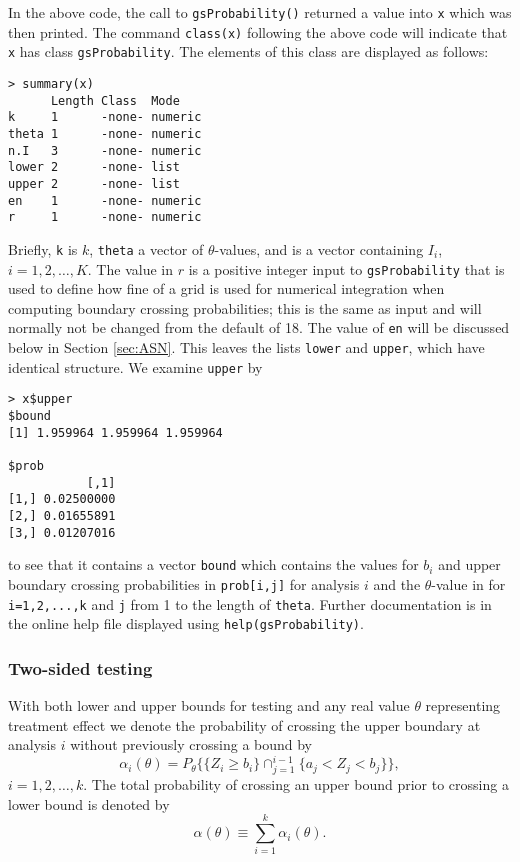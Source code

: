 In the above code, the call to \texttt{gsProbability()} returned a value into \texttt{x} which was then printed. The command \texttt{class(x)} following the above code will indicate that \texttt{x} has class \texttt{gsProbability}. The  elements of this class are displayed as follows:
\bigskip\begin{verbatim}
> summary(x)
      Length Class  Mode   
k     1      -none- numeric
theta 1      -none- numeric
n.I   3      -none- numeric
lower 2      -none- list   
upper 2      -none- list   
en    1      -none- numeric
r     1      -none- numeric
\end{verbatim}
Briefly, \texttt{k} is $k$, \texttt{theta} a vector of $\theta$-values, and  is a vector containing $I_i$, $i=1,2,\ldots,K$. The value in $r$ is a positive integer input to \texttt{gsProbability} that is used to define how fine of a grid is used for numerical integration when computing boundary crossing probabilities; this is the same as input and will normally not be changed from the default of 18. 
The value of \texttt{en} will be discussed below in Section \ref{sec:ASN}.
This leaves the lists \texttt{lower} and \texttt{upper}, which have identical structure. We examine \texttt{upper} by
\bigskip\begin{verbatim}
> x$upper
$bound
[1] 1.959964 1.959964 1.959964

$prob
           [,1]
[1,] 0.02500000
[2,] 0.01655891
[3,] 0.01207016
\end{verbatim}
to see that it contains a vector \texttt{bound} which contains the values for $b_i$ and upper boundary crossing probabilities in \texttt{prob[i,j]} for analysis $i$ and the $\theta$-value in  for \texttt{i=1,2,...,k} and \texttt{j} from 1 to the length of \texttt{theta}.
Further documentation is in the online help file displayed using \texttt{help(gsProbability)}.

\subsubsection{Two-sided testing\label{sec:binding}}
With both lower and upper bounds for testing and any real value $\theta$ representing treatment effect we denote the probability of crossing the upper boundary at analysis $i$ without previously crossing a bound by
\begin{equation}
\alpha_{i}(\theta)=P_{\theta}\{\{Z_{i}\geq b_{i}\}\cap_{j=1}^{i-1}%
\{a_{j}<Z_{j}<b_{j}\}\},\label{alphai(theta)}
\end{equation}
$i=1,2,\ldots,k.$
The total probability of crossing an upper bound prior to crossing a lower bound is denoted by 
\begin{equation}
\alpha(\theta)\equiv\sum_{i=1}^{k}\alpha_{i}(\theta)\label{alpha(theta)}.
\end{equation}

